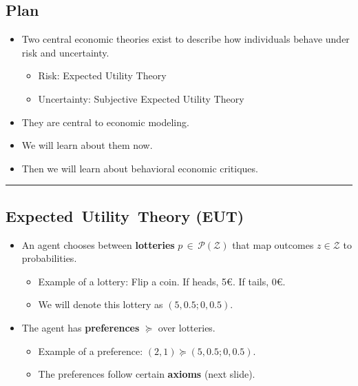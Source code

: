 \documentclass[
  letterpaper,
  DIV=11,
  numbers=noendperiod]{scrartcl}
\providecommand{\tightlist}{%
  \setlength{\itemsep}{0pt}\setlength{\parskip}{0pt}}\usepackage{longtable,booktabs,array}
\begin{document}
\subsection{Plan}\label{plan}

\begin{itemize}
\tightlist
\item
  Two central economic theories exist to describe how individuals behave
  under risk and uncertainty.

  \begin{itemize}
  \tightlist
  \item
    Risk: Expected Utility Theory
  \item
    Uncertainty: Subjective Expected Utility Theory
  \end{itemize}
\item
  They are central to economic modeling.
\item
  We will learn about them now.
\item
  Then we will learn about behavioral economic critiques.
\end{itemize}

\begin{center}\rule{0.5\linewidth}{0.5pt}\end{center}

\subsection{Expected~Utility~Theory
(EUT)}\label{expected-utility-theory-eut}

\begin{itemize}
\tightlist
\item
  An agent chooses between \textbf{lotteries}
  \(p\,\in\,\mathcal{P}(\mathcal{Z})\) that map outcomes
  \(z\in\mathcal{Z}\) to probabilities.

  \begin{itemize}
  \tightlist
  \item
    Example of a lottery: Flip a coin. If heads, 5€. If tails, 0€.
  \item
    We will denote this lottery as \((5, 0.5; 0, 0.5)\).
  \end{itemize}
\item
  The agent has \textbf{preferences} \(\succeq\) over lotteries.

  \begin{itemize}
  \tightlist
  \item
    Example of a preference: \((2, 1)\succeq (5, 0.5; 0, 0.5)\).
  \item
    The preferences follow certain \textbf{axioms} (next slide).
  \end{itemize}
\end{itemize}
\end{document}

